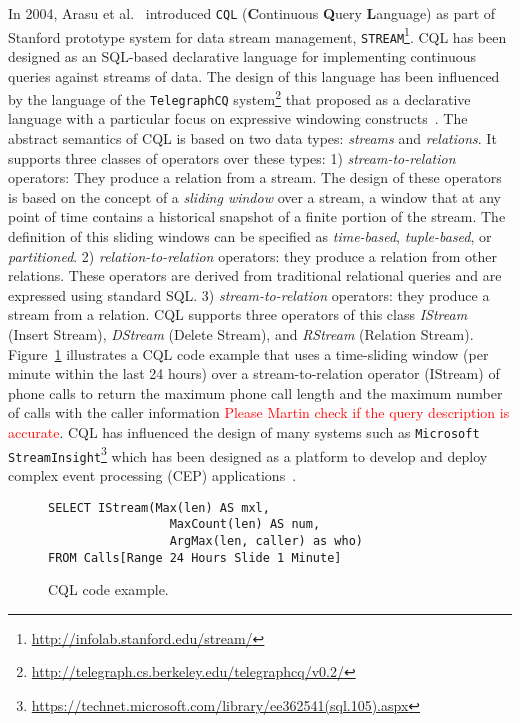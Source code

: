 In 2004, Arasu et al.~\cite{arasu_widom_2004} introduced  \texttt{CQL} (\textbf{C}ontinuous \textbf{Q}uery \textbf{L}anguage) as part of Stanford prototype system for data stream management, \texttt{STREAM}\footnote{\url{http://infolab.stanford.edu/stream/}}. CQL has been designed as an SQL-based declarative language for implementing continuous queries against streams of data. The design of this language has been influenced by the language of the \texttt{TelegraphCQ} system\footnote{\url{http://telegraph.cs.berkeley.edu/telegraphcq/v0.2/}} that proposed as a declarative language with a particular focus on expressive windowing constructs~\cite{chandrasekaran_et_al_2003}. The abstract semantics of CQL is based on two data types: \emph{streams} and \emph{relations}. It supports three classes of operators over
these types: 1) \emph{stream-to-relation} operators: They produce a relation from a stream.  The design of these operators is based on the concept of a \emph{sliding window} over a stream, a window that at any point of time contains a historical snapshot of a finite portion of the stream. The definition of this sliding windows can be specified as \emph{time-based}, \emph{tuple-based},
or \emph{partitioned}. 2) \emph{relation-to-relation} operators: they produce a relation from other relations. These operators are derived from traditional relational queries and are expressed using standard SQL. 3) \emph{stream-to-relation} operators: they produce a stream from a relation. CQL supports three operators of this class \emph{IStream} (Insert Stream), \emph{DStream} (Delete Stream), and \emph{RStream} (Relation Stream).  Figure~\ref{fig:cql} illustrates a CQL code example that uses a time-sliding window (per minute within the last 24 hours) over a stream-to-relation operator (IStream) of phone calls to return the maximum phone call length and the maximum number of calls with the caller information \textcolor{red}{Please Martin check if the query description is accurate}. CQL has influenced the design of many systems such as \texttt{Microsoft StreamInsight}\footnote{\url{https://technet.microsoft.com/library/ee362541(sql.105).aspx}} which has been designed as a platform to develop and deploy complex event processing (CEP) applications~\cite{ali_et_al_2009}.
\begin{figure}
\begin{lstlisting}
SELECT IStream(Max(len) AS mxl,
                 MaxCount(len) AS num,
                 ArgMax(len, caller) as who)
FROM Calls[Range 24 Hours Slide 1 Minute]
\end{lstlisting}
\vspace*{-4mm}
\caption{\label{fig:cql}CQL code example.}
\end{figure}